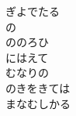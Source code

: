 \documentclass[10pt,b5j]{tarticle} %
\begin{document}
\begin{enumerate}
\begin{minipage}[c]{\blocksize}
        \vspace{\linespace}
        \item
        ぎよでたる\\
        の\\
        ののろひ\\
        にはえて\\
        むなりの\\
        のきをきては\\
        まなむしかる
    
    \end{minipage}
\end{enumerate} %
\end{document}
